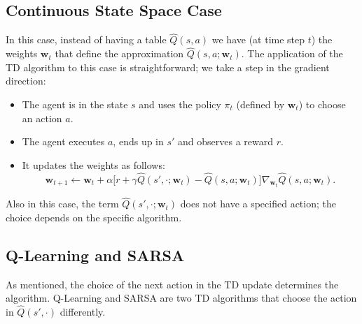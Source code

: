 \documentclass[10pt, a4paper]{report}
\begin{document}
\subsection{Continuous State Space Case}
In this case, instead of having a table $\hat Q(s,a)$ we have (at time step $t$) the weights $\mathbf w_t$ that define the approximation $\hat Q(s,a;\mathbf w_t)$. The application of the TD algorithm to this case is straightforward; we take a step in the gradient direction:
\begin{itemize}
    \item The agent is in the state $s$ and uses the policy $\pi_t$ (defined by $\mathbf w_t$) to choose an action $a$.
    \item The agent executes $a$, ends up in $s'$ and observes a reward $r$.
    \item It updates the weights as follows:
    \begin{equation}
        \boxed{
            \mathbf{w}_{t+1} \leftarrow \mathbf{w}_t + \alpha \Big[ r + \gamma \hat{Q}(s', \cdot; \mathbf{w}_t) - \hat{Q}(s, a; \mathbf{w}_t) \Big] \nabla_{\mathbf{w}_t} \hat{Q}(s, a; \mathbf{w}_t)
        }.
    \end{equation}
\end{itemize}
Also in this case, the term $\hat{Q}(s', \cdot; \mathbf{w}_t)$ does not have a specified action; the choice depends on the specific algorithm.
\subsection{Q-Learning and SARSA}
As mentioned, the choice of the next action in the TD update determines the algorithm. Q-Learning and SARSA are two TD algorithms that choose the action in $\hat Q(s', \cdot)$ differently.
\end{document}
